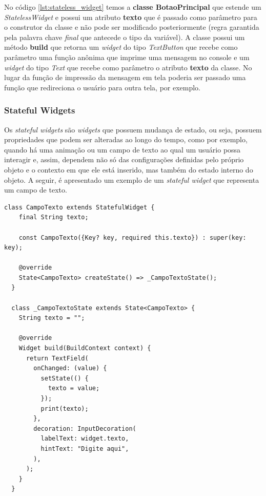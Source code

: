 No código \ref{lst:stateless_widget} temos a \textbf{classe BotaoPrincipal} que estende um \textit{StatelessWidget} e possui um atributo \textbf{texto} que é passado como parâmetro para o construtor da classe e não pode ser modificado posteriormente (regra garantida pela palavra chave \textit{final} que antecede o tipo da variável). A classe possui um método \textbf{build} que retorna um \textit{widget} do tipo \textit{TextButton} que recebe como parâmetro uma função anônima que imprime uma mensagem no console e um \textit{widget} do tipo \textit{Text} que recebe como parâmetro o atributo \textbf{texto} da classe. No lugar da função de impressão da mensagem em tela poderia ser passado uma função que redireciona o usuário para outra tela, por exemplo.


\subsubsection{Stateful Widgets}
\label{cap2:SubSubSec:StatefulWidgets}
Os \textit{stateful widgets} são \textit{widgets} que possuem mudança de estado, ou seja, possuem propriedades que podem ser alteradas ao longo do tempo, como por exemplo, quando há uma animação ou um campo de texto ao qual um usuário possa interagir e, assim, dependem não só das configurações definidas pelo próprio objeto e o contexto em que ele está inserido, mas também do estado interno do objeto. A seguir, é apresentado um exemplo de um \textit{stateful widget} que representa um campo de texto.

\begin{lstlisting}[caption={Exemplo de um \textit{stateful widget} que representa um campo de texto.}, label={lst:stateful_widget}]
  class CampoTexto extends StatefulWidget {
    final String texto;

    const CampoTexto({Key? key, required this.texto}) : super(key: key);

    @override
    State<CampoTexto> createState() => _CampoTextoState();
  }

  class _CampoTextoState extends State<CampoTexto> {
    String texto = "";

    @override
    Widget build(BuildContext context) {
      return TextField(
        onChanged: (value) {
          setState(() {
            texto = value;
          });
          print(texto);
        },
        decoration: InputDecoration(
          labelText: widget.texto,
          hintText: "Digite aqui",
        ),
      );
    }
  }
\end{lstlisting}

